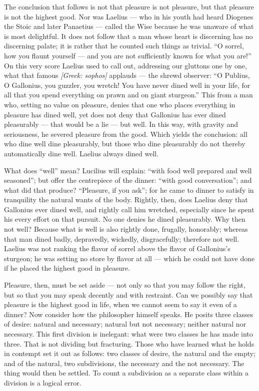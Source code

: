 The conclusion that follows is not that pleasure is not pleasure, but that pleasure is not the highest good. Nor was Laelius — who in his youth had heard Diogenes the Stoic and later Panaetius — called the Wise because he was unaware of what is most delightful. It does not follow that a man whose heart is discerning has no discerning palate; it is rather that he counted such things as trivial. ``O sorrel, how you flaunt yourself — and you are not sufficiently known for what you are!'' On this very score Laelius used to call out, addressing our gluttons one by one, what that famous \textit{[Greek: sophos]} applauds — the shrewd observer: ``O Publius, O Gallonius, you guzzler, you wretch! You have never dined well in your life, for all that you spend everything on prawn and on giant sturgeon.'' This from a man who, setting no value on pleasure, denies that one who places everything in pleasure has dined well, yet does not deny that Gallonius has ever dined pleasurably — that would be a lie — but well. In this way, with gravity and seriousness, he severed pleasure from the good. Which yields the conclusion: all who dine well dine pleasurably, but those who dine pleasurably do not thereby automatically dine well. Laelius always dined well.

What does ``well'' mean? Lucilius will explain: ``with food well prepared and well seasoned''; but offer the centrepiece of the dinner: ``with good conversation''; and what did that produce? ``Pleasure, if you ask''; for he came to dinner to satisfy in tranquility the natural wants of the body. Rightly, then, does Laelius deny that Gallonius ever dined well, and rightly call him wretched, especially since he spent his every effort on that pursuit. No one denies he dined pleasurably. Why then not well? Because what is well is also rightly done, frugally, honorably; whereas that man dined badly, depravedly, wickedly, disgracefully; therefore not well. Laelius was not ranking the flavor of sorrel above the flavor of Gallonius's sturgeon; he was setting no store by flavor at all — which he could not have done if he placed the highest good in pleasure.

Pleasure, then, must be set aside — not only so that you may follow the right, but so that you may speak decently and with restraint. Can we possibly say that pleasure is the highest good in life, when we cannot seem to say it even of a dinner? Now consider how the philosopher himself speaks. He posits three classes of desire: natural and necessary; natural but not necessary; neither natural nor necessary. This first division is inelegant: what were two classes he has made into three. That is not dividing but fracturing. Those who have learned what he holds in contempt set it out as follows: two classes of desire, the natural and the empty; and of the natural, two subdivisions, the necessary and the not necessary. The thing would then be settled. To count a subdivision as a separate class within a division is a logical error.

